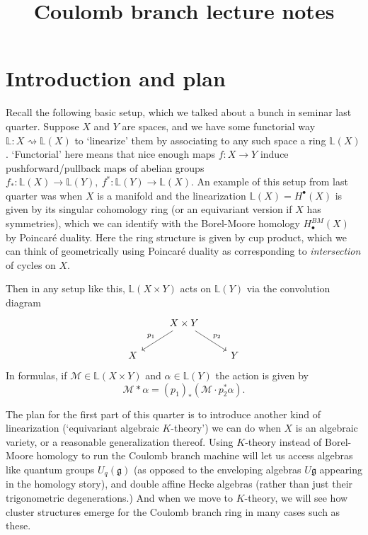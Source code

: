 \documentclass[11pt]{amsart}
\title[Math 520]{{Coulomb branch lecture notes }}
\theoremstyle{definition}
\newcommand{\g}{\mathfrak{g}}
\newcommand{\Lbb}{\mathbb{L}}
\numberwithin{equation}{subsection}
\numberwithin{figure}{subsection}
\begin{document}
\maketitle
\tableofcontents

\section{Introduction and plan}
Recall the following basic setup, which we talked about a bunch in seminar last quarter. Suppose $X$ and $Y$ are spaces, and we have some functorial way $\mathbb{L}\colon X\rightsquigarrow \mathbb{L}(X)$ 
to `linearize' them by associating to any such space a ring $\Lbb(X)$. `Functorial' here means that nice enough maps $f:X\rightarrow Y$ induce pushforward/pullback maps of abelian groups $f_*:\Lbb(X)\rightarrow\Lbb(Y),~f^*:\Lbb(Y)\rightarrow\Lbb(X)$. An example of this setup from last quarter was when $X$ is a manifold and the linearization $\Lbb(X)=H^\bullet(X)$ is given by its singular cohomology ring (or an equivariant version if $X$ has symmetries), which we can identify with the Borel-Moore homology $H^{BM}_\bullet(X)$ by Poincar\'e duality. Here the ring structure is given by cup product, which we can think of geometrically using Poincar\'e duality as corresponding to \emph{intersection} of cycles on $X$.

Then in any setup like this, $\Lbb(X\times Y)$ acts on $\Lbb(Y)$ via the convolution diagram
$$
\begin{tikzcd}
& X\times Y \arrow{dl}[swap]{p_1}\arrow{dr}{p_2}  & \\
X& & Y
\end{tikzcd}
$$
In formulas, if $\mathcal{M}\in\Lbb(X\times Y)$ and $\alpha\in \Lbb(Y)$ the action is given by
$$
\mathcal{M}*\alpha = (p_1)_*\left(\mathcal{M}\cdot p_2^*\alpha\right).
$$

The plan for the first part of this quarter is to introduce another kind of linearization (`equivariant algebraic $K$-theory') we can do when $X$ is an algebraic variety, or a reasonable generalization thereof. Using $K$-theory instead of Borel-Moore homology to run the Coulomb branch machine will let us access algebras like quantum groups $U_q(\g)$ (as opposed to the enveloping algebras $U\g$ appearing in the homology story), and double affine Hecke algebras (rather than just their trigonometric degenerations.) And when we move to $K$-theory, we will see how cluster structures emerge for the Coulomb branch ring in many cases such as these. 
\end{document}
